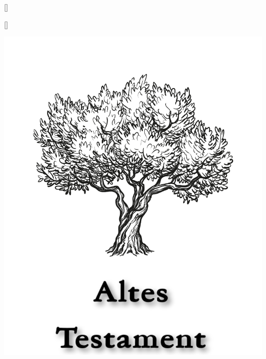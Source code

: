 
\titleformat{\section}[hang]{\bfseries\huge}{}{0ex}{}[]

\titleformat{\section}[wrap]{\bfseries\huge}{}{0ex}{}[]
\newpage

\tableofcontents
\newpage

\null\vfill
\begin{center}
\begin{minipage}[c]{\textwidth}
  \begin{center}
  \includegraphics{AltesTestamentTitel.pdf}
  \end{center}
\end{minipage}
\end{center}
\null\vfill
\newpage

\pagestyle{bible}

\renewcommand{\cleardoublepage}{\clearpage}

